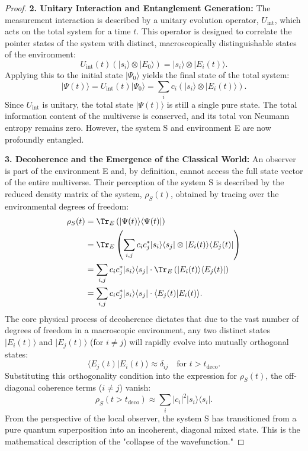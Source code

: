\documentclass[11pt, letterpaper]{report}
\theoremstyle{plain} %
\theoremstyle{definition} %
\theoremstyle{remark} %
\begin{document}
\begin{proof}
\textbf{2. Unitary Interaction and Entanglement Generation:}
The measurement interaction is described by a unitary evolution operator, $U_{\text{int}}$, which acts on the total system for a time $t$. This operator is designed to correlate the pointer states of the system with distinct, macroscopically distinguishable states of the environment:
\begin{equation}
    U_{\text{int}}(t) \left(|s_i\rangle \otimes |E_0\rangle\right) = |s_i\rangle \otimes |E_i(t)\rangle.
\end{equation}
Applying this to the initial state $|\Psi_0\rangle$ yields the final state of the total system:
\begin{equation}
    |\Psi(t)\rangle = U_{\text{int}}(t)|\Psi_0\rangle = \sum_i c_i \left(|s_i\rangle \otimes |E_i(t)\rangle\right).
    \label{eq:entangled_system_environment}
\end{equation}
Since $U_{\text{int}}$ is unitary, the total state $|\Psi(t)\rangle$ is still a single pure state. The total information content of the multiverse is conserved, and its total von Neumann entropy remains zero. However, the system S and environment E are now profoundly entangled.

\textbf{3. Decoherence and the Emergence of the Classical World:}
An observer is part of the environment E and, by definition, cannot access the full state vector of the entire multiverse. Their perception of the system S is described by the reduced density matrix of the system, $\rho_S(t)$, obtained by tracing over the environmental degrees of freedom:
\begin{align}
    \rho_S(t) &= \Tr_E\left(|\Psi(t)\rangle\langle\Psi(t)|\right) \\
    &= \Tr_E\left( \sum_{i,j} c_i c_j^* |s_i\rangle\langle s_j| \otimes |E_i(t)\rangle\langle E_j(t)| \right) \\
    &= \sum_{i,j} c_i c_j^* |s_i\rangle\langle s_j| \cdot \Tr_E\left( |E_i(t)\rangle\langle E_j(t)| \right) \\
    &= \sum_{i,j} c_i c_j^* |s_i\rangle\langle s_j| \cdot \langle E_j(t)|E_i(t)\rangle.
\end{align}
The core physical process of decoherence dictates that due to the vast number of degrees of freedom in a macroscopic environment, any two distinct states $|E_i(t)\rangle$ and $|E_j(t)\rangle$ (for $i \neq j$) will rapidly evolve into mutually orthogonal states:
\begin{equation}
    \langle E_j(t)|E_i(t)\rangle \approx \delta_{ij} \quad \text{for } t > t_{\text{deco}}.
\end{equation}
Substituting this orthogonality condition into the expression for $\rho_S(t)$, the off-diagonal coherence terms ($i \neq j$) vanish:
\begin{equation}
    \rho_S(t > t_{\text{deco}}) \approx \sum_i |c_i|^2 |s_i\rangle\langle s_i|.
    \label{eq:decohered_rho_s}
\end{equation}
From the perspective of the local observer, the system S has transitioned from a pure quantum superposition into an incoherent, diagonal mixed state. This is the mathematical description of the "collapse of the wavefunction."


\end{proof}
\end{document}
